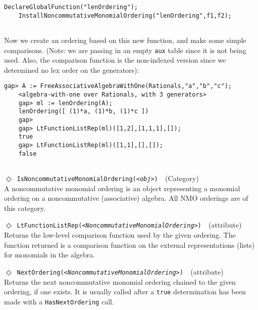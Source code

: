\documentclass[a4paper,11pt]{report}
\begin{document}
{{{\begin{Verbatim}[fontsize=\small,frame=single,label=Example]
    DeclareGlobalFunction("lenOrdering");
    InstallNoncommutativeMonomialOrdering("lenOrdering",f1,f2);
    
\end{Verbatim}
 Now we create an ordering based on this new function, and make some simple
comparisons. (Note: we are passing in an empty \texttt{aux} table since it is not being used. Also, the comparison function is the
non-indexed version since we determined no lex order on the generators): 
\begin{Verbatim}[fontsize=\small,frame=single,label=Example]
    gap> A := FreeAssociativeAlgebraWithOne(Rationals,"a","b","c");
    <algebra-with-one over Rationals, with 3 generators>
    gap> ml := lenOrdering(A);
    lenOrdering([ (1)*a, (1)*b, (1)*c ])
    gap>
    gap> LtFunctionListRep(ml)([1,2],[1,1,1],[]);
    true
    gap> LtFunctionListRep(ml)([1,1],[],[]);
    false
    
\end{Verbatim}
 

 \noindent\textcolor{FuncColor}{$\Diamond$\ \texttt{IsNoncommutativeMonomialOrdering({\slshape {\textless}obj{\textgreater}})
\label{IsNoncommutativeMonomialOrdering}
}\hfill{\scriptsize (Category)}}\\


 A noncommutative monomial ordering is an object representing a monomial
ordering on a noncommutative (associative) algebra. All \textsf{NMO} orderings are of this category. 

 \noindent\textcolor{FuncColor}{$\Diamond$\ \texttt{LtFunctionListRep({\slshape {\textless}NoncommutativeMonomialOrdering{\textgreater}})
\label{LtFunctionListRep}
}\hfill{\scriptsize (attribute)}}\\


 Returns the low-level comparison function used by the given ordering. The
function returned is a comparison function on the external representations
(lists) for monomials in the algebra. 

 \noindent\textcolor{FuncColor}{$\Diamond$\ \texttt{NextOrdering({\slshape {\textless}NoncommutativeMonomialOrdering{\textgreater}})
\label{NextOrdering}
}\hfill{\scriptsize (attribute)}}\\


 Returns the next noncommutative monomial ordering chained to the given
ordering, if one exists. It is usually called after a \texttt{true} determination has been made with a \texttt{HasNextOrdering} call. 

}}}
\end{document}
